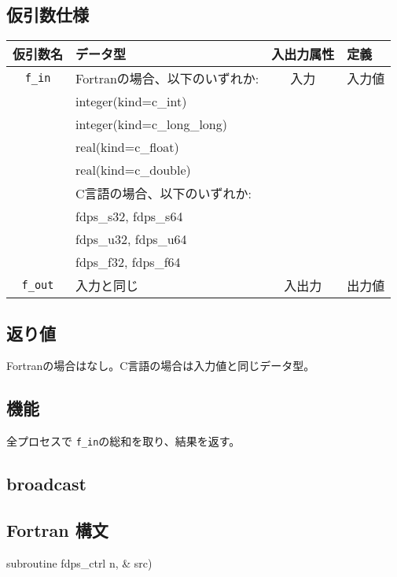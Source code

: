 \subsection*{仮引数仕様}
\begin{table}[h]
\begin{tabularx}{\linewidth}{clcX}
\toprule
\rowcolor{Snow2}
仮引数名 & データ型 & 入出力属性 & 定義 \\
\midrule
\verb|f_in| & Fortranの場合、以下のいずれか: & 入力 & 入力値\\
            & integer(kind=c\_int) &&\\
            & integer(kind=c\_long\_long) &&\\
            & real(kind=c\_float) &&\\
            & real(kind=c\_double) &&\\
            & C言語の場合、以下のいずれか: &&\\
            & fdps\_s32, fdps\_s64 && \\
            & fdps\_u32, fdps\_u64 && \\
            & fdps\_f32, fdps\_f64 && \\
\verb|f_out| & 入力と同じ &入出力  & 出力値\\
\bottomrule
\end{tabularx}
\end{table}

\subsection*{返り値}
Fortranの場合はなし。C言語の場合は入力値と同じデータ型。

\subsection*{機能}
全プロセスで {\tt f\_in}の総和を取り、結果を返す。
\clearpage

\subsection{broadcast}
\subsection*{Fortran 構文}
\begin{screen}
\begin{spverbatim}
subroutine fdps_ctrl%
                               n,   &
                               src)
\end{spverbatim}
\end{screen}

